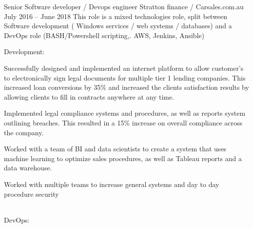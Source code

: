 \begin{cventries}
  \cventryextended
  {Senior Software developer / Devops engineer}
  {Stratton finance / Carsales.com.au} %
  {} %
  {July 2016 – June 2018} %
  {This role is a mixed technologies role,  split between Software development
    ( Windows services / web systems /
    databases) and a DevOps role (BASH/Powershell scripting,. AWS, Jenkins,
    Ansible) }
  {
    \begin{cvitems} %
      \item{Development:
                  \\
                  \begin{cvitems}
                    \item {Successfully designed and implemented an internet
                                platform to allow customer’s to
                                electronically sign legal documents for
                                multiple tier 1 lending companies. This
                                increased loan conversions by 35\% and
                                increased the
                                clients satisfaction results by allowing
                                clients to fill in contracts anywhere at any
                                time.}
                    \item {Implemented legal compliance systems and procedures,
                                as well as reports system outlining
                                breaches. This resulted in a 15\% increase on
                                overall compliance across the company.}
                    \item {Worked with a team of BI and data scientists to
                                create a system that uses machine learning
                                to optimize sales procedures, as well as
                                Tableau reports and a data warehouse. }
                    \item {Worked with multiple teams to increase general
                                systems and day to day procedure security
                                \\\\}
                  \end{cvitems}
            }
      \item{DevOps:
                  \\
}
\end{cvitems}}
\end{cventries}

